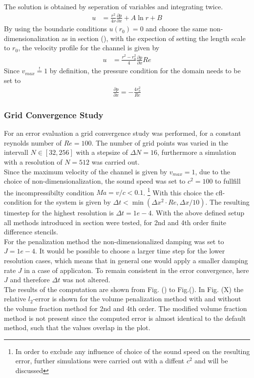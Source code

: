 The solution is obtained by seperation of variables and integrating twice.
\begin{align}
    u &= \frac{r^2}{4\nu}\frac{\partial p}{\partial x} + A \ln r + B
\end{align}
By using the boundarie conditions $u(r_0) = 0$ and choose the same non-dimensionalization as in section (), with the expection of setting the length scale to $r_0$,
the velocity profile for the channel is given by
\begin{align}
    u &= \frac{r^2 - r_0^2}{4}\frac{\partial p}{\partial x}Re
\end{align}
Since $v_{max} \stackrel{!}{=} 1$ by definition, the pressure condition for the domain needs to be set to
\begin{align}
    \frac{\partial p}{\partial x} = -\frac{4 r_o^2}{Re}
\end{align}

\subsubsection{Grid Convergence Study}

For an error evaluation a grid convergence study was performed, for a constant reynolds number of $Re=100$.
The number of grid points was varied in the intervall $N\in[32, 256]$ with a stepsize of $\Delta N = 16$, furthermore a
simulation with a resolution of $N=512$ was carried out.\\
Since the maximum velocity of the channel is given by $v_{max}=1$, due to the choice of non-dimensionalization,
the sound speed was set to $c^2 = 100$ to fullfill the incompressibilty condition $Ma = v/c < 0.1$. \footnote{In order to exclude
any influence of choice of the sound speed on the resulting error, further simulations were carried out with a diffent $c^2$ and will be discussed}
With this choice the cfl-condition for the system is given by $\Delta t < \min(\Delta x^2 \cdot Re, \Delta x / 10)$.
The resulting timestep for the highest resolution is $\Delta t = 1e-4$.
With the above defined setup all methods introduced in section were tested, for 2nd and 4th order finite difference stencils.\\
For the penalization method the non-dimensionalized damping was set to $J=1e-4$.
It would be possible to choose a larger time step for the lower resolution cases, which means that in general
one would apply a smaller damping rate $J$ in a case of applicaton. To remain consistent in the error convergence, here $J$ and
therefore $\Delta t$ was not altered.\\
The results of the computation are shown from Fig. () to Fig.().
In Fig. (X) the relative $l_2$-error is shown for the volume penalization method with and without the volume fraction method
for 2nd and 4th order. The modified volume fraction method is not present since the computed error is almost identical to the default method,
such that the values overlap in the plot.

